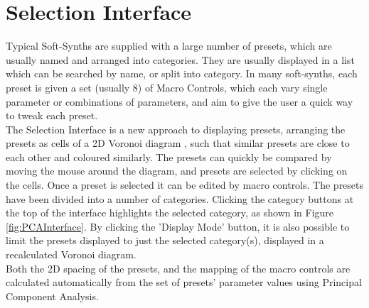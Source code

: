 \documentclass[11pt, oneside]{report}   	%
\begin{document}
\section{Selection Interface}
Typical Soft-Synths are supplied with a large number of presets, which are usually named and arranged into categories. They are usually displayed in a list which can be searched by name, or split into category. In many soft-synths, each preset is given a set (usually 8) of Macro Controls, which each vary single parameter or combinations of parameters, and aim to give the user a quick way to tweak each preset.\\
The Selection Interface is a new approach to displaying presets, arranging the presets as cells of a 2D Voronoi diagram \cite{Voronoi}, such that similar presets are close to each other and coloured similarly. The presets can quickly be compared by moving the mouse around the diagram, and presets are selected by clicking on the cells. Once a preset is selected it can be edited by macro controls. 
The presets have been divided into a number of categories. Clicking the category buttons at the top of the interface highlights the selected category, as shown in Figure \ref{fig:PCAInterface}. By clicking the 'Display Mode' button, it is also possible to limit the presets displayed to just the selected category(s), displayed in a recalculated Voronoi diagram.\\
Both the 2D spacing of the presets, and the mapping of the macro controls are calculated automatically from the set of presets' parameter values using Principal Component Analysis.
\end{document}
